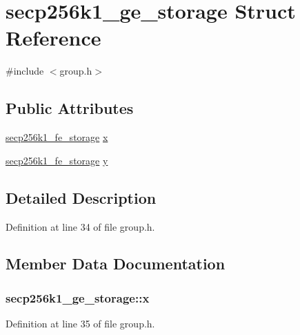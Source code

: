 \hypertarget{structsecp256k1__ge__storage}{}\section{secp256k1\+\_\+ge\+\_\+storage Struct Reference}
\label{structsecp256k1__ge__storage}


{\ttfamily \#include $<$group.\+h$>$}

\subsection*{Public Attributes}
\begin{DoxyCompactItemize}
\item 
\hyperlink{structsecp256k1__fe__storage}{secp256k1\+\_\+fe\+\_\+storage} \hyperlink{structsecp256k1__ge__storage_abace3c7f244d8e7e42ac1b66a071371b}{x}
\item 
\hyperlink{structsecp256k1__fe__storage}{secp256k1\+\_\+fe\+\_\+storage} \hyperlink{structsecp256k1__ge__storage_af0b13f3e06135a94484cc6f6dd4ef3cc}{y}
\end{DoxyCompactItemize}


\subsection{Detailed Description}


Definition at line 34 of file group.\+h.



\subsection{Member Data Documentation}
\hypertarget{structsecp256k1__ge__storage_abace3c7f244d8e7e42ac1b66a071371b}{}
\subsubsection[{x}]{ secp256k1\+\_\+ge\+\_\+storage\+::x}\label{structsecp256k1__ge__storage_abace3c7f244d8e7e42ac1b66a071371b}


Definition at line 35 of file group.\+h.

\hypertarget{structsecp256k1__ge__storage_af0b13f3e06135a94484cc6f6dd4ef3cc}{}
